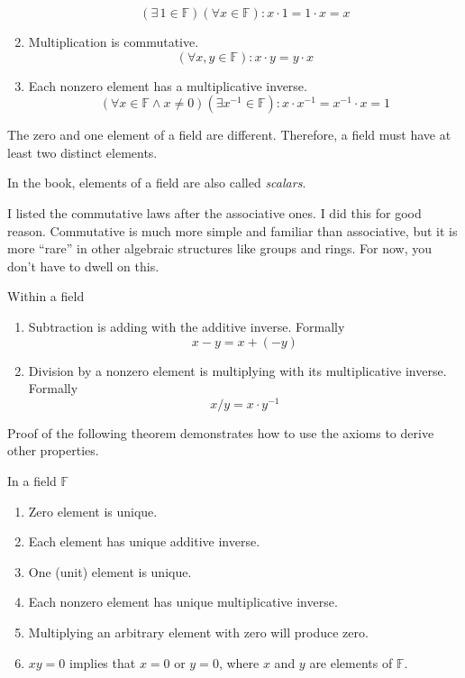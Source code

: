 \begin{definition}[Field]
\begin{enumerate}[label = (\arabic*)]
              \[
                  (\exists\,1\in\mathbb{F})(\forall x\in\mathbb{F}): x\cdot 1 = 1\cdot x = x
              \]
        \item Multiplication is commutative.\label{field:multiplication-commutative}
              \[
                  (\forall x, y\in\mathbb{F}): x\cdot y = y\cdot x
              \]
        \item Each nonzero element has a multiplicative inverse.\label{field:multiplicative-inverse}
              \[
                  (\forall x\in\mathbb{F} \wedge x\ne 0)(\exists x^{-1}\in\mathbb{F}): x\cdot x^{-1} = x^{-1}\cdot x = 1
              \]
    \end{enumerate}
\end{definition}

\begin{note}
    The zero and one element of a field are different. Therefore, a field must have at least two distinct elements.

    In the book, elements of a field are also called \textit{scalars}.

    I listed the commutative laws after the associative ones. I did this for good reason. Commutative is much more simple and familiar than associative, but it is more ``rare'' in other algebraic structures like groups and rings. For now, you don't have to dwell on this.
\end{note}

\begin{definition}
    Within a field
    \begin{enumerate}
        \item Subtraction is adding with the additive inverse. Formally
              \[
                  x - y = x + (-y)
              \]
        \item Division by a nonzero element is multiplying with its multiplicative inverse. Formally
              \[
                  x / y = x\cdot y^{-1}
              \]
    \end{enumerate}
\end{definition}

Proof of the following theorem demonstrates how to use the axioms to derive other properties.

\begin{theorem}\label{thm:field-properties}
    In a field $\mathbb{F}$
    \begin{enumerate}[label = (\roman*)]
        \item Zero element is unique.
        \item Each element has unique additive inverse.
        \item One (unit) element is unique.
        \item Each nonzero element has unique multiplicative inverse.
        \item Multiplying an arbitrary element with zero will produce zero.
        \item $xy = 0$ implies that $x = 0$ or $y = 0$, where $x$ and $y$ are elements of $\mathbb{F}$.
    \end{enumerate}
\end{theorem}

